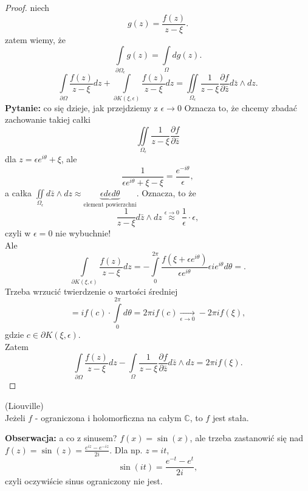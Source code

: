 \documentclass[../main.tex]{subfiles}
\begin{document}
 \begin{proof}
     niech
     \[
         g(z) = \frac{f(z)}{z - \xi}
     .\]
     zatem wiemy, że
     \[
         \int\limits_{\partial \Omega_\epsilon}g(z) = \int\limits_{\Omega} d g(z)
     .\]
 \[
     \int\limits_{\partial \Omega} \frac{f(z)}{z - \xi}dz + \int\limits_{\partial K(\xi, \epsilon)} \frac{f(z)}{z - \xi}dz = \iint\limits_{\Omega_\epsilon}\frac{1}{z-\xi} \frac{\partial f}{\partial \bar{z}} d\bar{z}\land dz
 .\]
 \textbf{Pytanie:} co się dzieje, jak przejdziemy z $\epsilon\to 0$ Oznacza to, że chcemy zbadać zachowanie takiej całki
     \[
         \iint\limits_{\Omega_{\epsilon}} \frac{1}{z-\xi}\frac{\partial f}{\partial \bar{z}}
     \]
 dla $z = \epsilon e^{i\theta} + \xi$, ale
     \[
         \frac{1}{\epsilon e^{i\theta} + \xi - \xi} = \frac{e^{-i\theta}}{\epsilon}
     ,\]
 a całka $\iint\limits_{\Omega_\epsilon} d\bar{z}\land dz \approx \underbrace{\epsilon d\epsilon d\theta}_{\text{element powierzchni}}$.
     Oznacza, to że
     \[
         \frac{1}{z-\xi} d\bar{z}\land dz \overset{\epsilon \to 0}{\approx} \frac{1}{\epsilon} \cdot \epsilon
     ,\]
 czyli w $\epsilon = 0$ nie wybuchnie!\\
     Ale
     \[
         \int\limits_{\partial K(\xi, \epsilon)} \frac{f(z)}{z-\xi} dz = - \int\limits_0^{2\pi} \frac{f(\xi + \epsilon e^{i\theta})}{\epsilon e^{i\theta}} \epsilon i e^{i\theta} d\theta =
     .\]
 Trzeba wrzucić twierdzenie o wartości średniej
     \[
         = i f(c) \cdot \int\limits_{0}^{2\pi}d\theta = 2 \pi i f(c) \underset{\epsilon \to 0}{\longrightarrow}-2\pi i f(\xi)
     ,\]
 gdzie $c\in \partial K(\xi, \epsilon)$.\\
     Zatem
     \[
         \int\limits_{\partial \Omega} \frac{f(z)}{z - \xi}dz - \int\limits_{\Omega}\frac{1}{z-\xi}\frac{\partial f}{\partial \bar{z}} d\bar{z}\land dz = 2 \pi i f(\xi)
     .\]
\end{proof}
\begin{tw}
    (Liouville)\\
    Jeżeli $f$ - ograniczona i holomorficzna na całym $\mathbb{C}$, to $f$ jest stała.
\end{tw}
\textbf{Obserwacja:} a co z sinusem?
$f(x) = \sin(x)$, ale trzeba zastanowić się nad  $f(z) = \sin(z) = \frac{e^{iz} - e^{-iz}}{2i}$. Dla np. $z = it$,
\[
    \sin(it) = \frac{e^{-t} - e^{t}}{2i}
,\]
czyli oczywiście sinus ograniczony nie jest.
\end{document}
